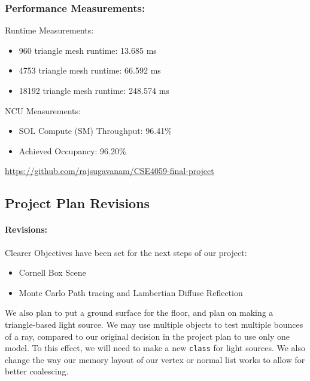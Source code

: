 \documentclass[12pt]{article}
\begin{document}
\subsubsection*{Performance Measurements:}

Runtime Measurements:
\begin{itemize}
    \item 960 triangle mesh runtime: 13.685 ms
    \item 4753 triangle mesh runtime: 66.592 ms
    \item 18192 triangle mesh runtime: 248.574 ms
\end{itemize}

NCU Measurements:
\begin{itemize}
    \item SOL Compute (SM) Throughput: 96.41\%
    \item Achieved Occupancy: 96.20\%
\end{itemize}

\href{https://github.com/rajsugavanam/CSE4059-final-project}{https://github.com/rajsugavanam/CSE4059-final-project}

\subsection*{Project Plan Revisions}

\paragraph{Revisions:}

Clearer Objectives have been set for the next steps of our project:

\begin{itemize}
    \item Cornell Box Scene
    \item Monte Carlo Path tracing and Lambertian Diffuse Reflection
\end{itemize}

We also plan to put a ground surface for the floor, and plan on making a triangle-based light source. We may use
multiple objects to test multiple bounces of a ray, compared to our original decision in the project plan to use only
one model. To this effect, we will need to make a new \texttt{class} for light sources. We also change the way our
memory layout of our vertex or normal list works to allow for better coalescing.
\end{document}
